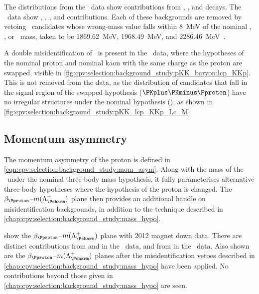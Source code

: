 The distributions from the \pKK\ data show contributions from 
\decay{\PDplus}{\PKplus\PKminus\Ppiplus}, 
\decay{\PDsplus}{\PKplus\PKminus\Ppiplus}, and 
\decay{\PLambdac}{\Pproton\PKminus\Ppiplus} decays.
The \ppipi\ data show \decay{\PDplus}{\PKplus\Ppiminus\Ppiplus}, 
\decay{\PDplus}{\PKplus\PKminus\Ppiplus}, 
\decay{\PDsplus}{\PKplus\Ppiminus\Ppiplus}, and 
\decay{\PDsplus}{\PKplus\PKminus\Ppiplus} contributions.
Each of these backgrounds are removed by vetoing \PLambdac\ candidates whose 
wrong-mass value falls within \SI{8}{\MeV} of the nominal \PDplus, \PDsplus, or 
\PLambdac\ mass, taken to be \SI{1869.62}{\MeV}, \SI{1968.49}{\MeV}, and 
\SI{2286.46}{\MeV}~\cite{PDG2014}.

A double misidentification of \pKK\ is present in the \pKK\ data, where the 
hypotheses of the nominal proton and nominal kaon with the same charge as the 
proton are swapped, visible in 
\cref{fig:cpv:selection:background_study:pKK_baryon:lcp_KKp}.
This is not removed from the data, as the distribution of candidates that fall 
in the signal region of the swapped hypothesis ($\PKplus\PKminus\Pproton$) have 
no irregular structures under the nominal hypothesis (\pKK), as shown in 
\cref{fig:cpv:selection:background_study:pKK_lcp_KKp_Lc_M}.

\subsection{Momentum asymmetry}
\label{chap:cpv:selection:background_study:mom_asym}

The momentum asymmetry of the proton is defined in 
\cref{eqn:cpv:selection:background_study:mom_asym}.
Along with the mass of the \PLambdac\ under the nominal three-body mass 
hypothesis, it fully parameterises alternative three-body hypotheses where the 
hypothesis of the proton is changed.
The $\beta_{\Pproton}$--$m(\PLambdac)$ plane then provides an additional handle 
on misidentification backgrounds, in addition to the technique described in 
\cref{chap:cpv:selection:background_study:mass_hypo}.

show the $\beta_{\Pproton}$--$m(\PLambdac)$ plane with 2012 magnet down data.
There are distinct contributions from \decay{\PDplus}{\PKplus\PKminus\Ppiplus} 
and \decay{\PDsplus}{\PKplus\PKminus\Ppiplus} in the \pKK\ data, and from 
\decay{\PDsplus}{\PKplus\Ppiminus\Ppiplus} in the \ppipi\ data.
Also shown are the $\beta_{\Pproton}$--$m(\PLambdac)$ planes after the 
misidentification vetoes described in 
\cref{chap:cpv:selection:background_study:mass_hypo} have been applied.
No contributions beyond those given in 
\cref{chap:cpv:selection:background_study:mass_hypo} are seen.


